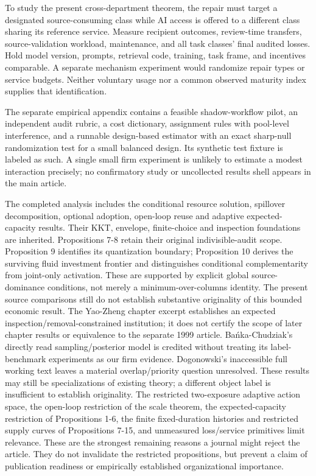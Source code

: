 \documentclass[
  11pt,
  a4paper,
]{article}
\begin{document}
To study the present cross-department theorem, the repair must target a
designated source-consuming class while AI access is offered to a
different class sharing its reference service. Measure recipient
outcomes, review-time transfers, source-validation workload,
maintenance, and all task classes' final audited losses. Hold model
version, prompts, retrieval code, training, task frame, and incentives
comparable. A separate mechanism experiment would randomize repair types
or service budgets. Neither voluntary usage nor a common observed
maturity index supplies that identification.

The separate empirical appendix contains a feasible shadow-workflow
pilot, an independent audit rubric, a cost dictionary, assignment rules
with pool-level interference, and a runnable design-based estimator with
an exact sharp-null randomization test for a small balanced design. Its
synthetic test fixture is labeled as such. A single small firm
experiment is unlikely to estimate a modest interaction precisely; no
confirmatory study or uncollected results shell appears in the main
article.

The completed analysis includes the conditional resource solution,
spillover decomposition, optional adoption, open-loop reuse and adaptive
expected-capacity results. Their KKT, envelope, finite-choice and
inspection foundations are inherited. Propositions 7-8 retain their
original indivisible-audit scope. Proposition 9 identifies its
quantization boundary; Proposition 10 derives the surviving fluid
investment frontier and distinguishes conditional complementarity from
joint-only activation. These are supported by explicit global
source-dominance conditions, not merely a minimum-over-columns identity.
The present source comparisons still do not establish substantive
originality of this bounded economic result. The Yao-Zheng chapter
excerpt establishes an expected inspection/removal-constrained
institution; it does not certify the scope of later chapter results or
equivalence to the separate 1999 article. Bańka-Chudziak's directly read
sampling/posterior model is credited without treating its
label-benchmark experiments as our firm evidence. Dogonowski's
inaccessible full working text leaves a material overlap/priority
question unresolved. These results may still be specializations of
existing theory; a different object label is insufficient to establish
originality. The restricted two-exposure adaptive action space, the
open-loop restriction of the scale theorem, the expected-capacity
restriction of Propositions 1-6, the finite fixed-duration histories and
restricted supply curves of Propositions 7-15, and unmeasured
loss/service primitives limit relevance. These are the strongest
remaining reasons a journal might reject the article. They do not
invalidate the restricted propositions, but prevent a claim of
publication readiness or empirically established organizational
importance.
\end{document}
